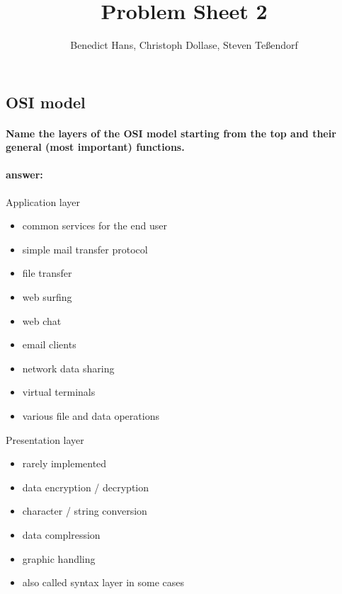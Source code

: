 \documentclass[a4paper,11pt]{article}
\author{Benedict Hans, Christoph Dollase, Steven Te\ss endorf}
\title{ \textbf{Problem Sheet 2}}
\begin{document}
	 
 \maketitle	 
 
 \subsection{OSI model}
 \paragraph{Name the layers of the OSI model starting from the top and their general (most important) functions.}
 \paragraph{answer:}
\begin{itemize}
	\begin{minipage}[t]{0.48\linewidth}
		\item Application layer
		\begin{itemize}
			\item common services for the end user
			\item simple mail transfer protocol
			\item file transfer
			\item web surfing
			\item web chat
			\item email clients
			\item network data sharing
			\item virtual terminals
			\item various file and data operations 
		\end{itemize}
	\end{minipage}
	\hfill
	\begin{minipage}[t]{0.48\linewidth}
			\item Presentation layer
		\begin{itemize}
			\item  rarely implemented
			\item  data encryption / decryption
			\item  character / string conversion
			\item  data complression
			\item  graphic handling
			\item  also called syntax layer in some cases
		\end{itemize}
	\end{minipage}\\


\end{itemize}
\end{document}
